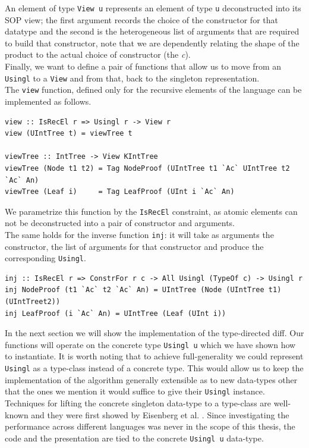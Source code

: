 \documentclass[11pt, titlepage]{article}
\newcommand{\toHaskell}[1]{\texttt{#1}\xspace}
\begin{document}
An element of type \texttt{View u} represents an element of type \texttt{u}  deconstructed into its SOP view; the first argument records the choice 
of the constructor for that datatype and the second is the heterogeneous list of 
arguments that are required to build that constructor, note that we are 
dependently relating the shape of the product to the actual choice of 
constructor (the \emph{c}).
\\
Finally, we want to define a pair of functions that allow us to move from an \toHaskell{Usingl} to a \toHaskell{View} and from that, back to the singleton representation.
\\
The \toHaskell{view} function, defined only for the recursive elements of the language can be implemented as follows.

\begin{verbatim}
view :: IsRecEl r => Usingl r -> View r
view (UIntTree t) = viewTree t

viewTree :: IntTree -> View KIntTree
viewTree (Node t1 t2) = Tag NodeProof (UIntTree t1 `Ac` UIntTree t2 `Ac` An)
viewTree (Leaf i)     = Tag LeafProof (UInt i `Ac` An)
\end{verbatim}

We parametrize this function by the \toHaskell{IsRecEl} constraint, as atomic elements can not be deconstructed into a pair of constructor and arguments.
\\
The same holds for the inverse function \toHaskell{inj}: it will take as arguments the constructor, the list of arguments for that constructor and produce the corresponding \toHaskell{Usingl}.

\begin{verbatim}
inj :: IsRecEl r => ConstrFor r c -> All Usingl (TypeOf c) -> Usingl r
inj NodeProof (t1 `Ac` t2 `Ac` An) = UIntTree (Node (UIntTree t1) (UIntTreet2))
inj LeafProof (i `Ac` An) = UIntTree (Leaf (UInt i))
\end{verbatim}

In the next section we will show the implementation of the type-directed diff. Our functions will operate on the concrete type \toHaskell{Usingl u} which we have shown how to instantiate.
It is worth noting that to achieve full-generality we could represent \toHaskell{Usingl} as a type-class instead of a concrete type. This would allow us to keep the implementation of the algorithm generally extensible as to new data-types other that the ones we mention it would suffice to give their \toHaskell{Usingl} instance. 
Techniques for lifting the concrete singleton data-type to a type-class are well-known and they were first showed by Eisenberg et al. \cite{singletons}. 
Since investigating the performance across different languages was never in the scope of this thesis, the code and the presentation are tied to the concrete \toHaskell{Usingl u} data-type.
\end{document}
